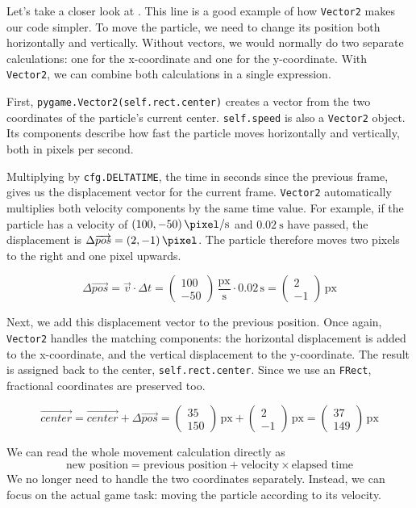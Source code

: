 \begin{hintbox}
	Let's take a closer look at . This line is a good example of how \texttt{Vector2} makes our code simpler. To move the particle, we need to change its position both horizontally and vertically. Without vectors, we would normally do two separate calculations: one for the x-coordinate and one for the y-coordinate. With \texttt{Vector2}, we can combine both calculations in a single expression.
	
	First, \texttt{pygame.Vector2(self.rect.center)} creates a vector from the two coordinates of the particle's current center. \texttt{self.speed} is also a \texttt{Vector2} object. Its components describe how fast the particle moves horizontally and vertically, both in pixels per second.
	
	Multiplying by \texttt{cfg.DELTATIME}, the time in seconds since the previous frame, gives us the displacement vector for the current frame. \texttt{Vector2} automatically multiplies both velocity components by the same time value. For example, if the particle has a velocity of $\mysi{(100, -50)}{\pixel\per\second}$ and $\SI{0.02}{\second}$ have passed, the displacement is $\Delta \overrightarrow{pos} = \mysi{(2, -1)}{\pixel}$. The particle therefore moves two pixels to the right and one pixel upwards.
	
	\[
	\Delta \overrightarrow{pos}
	= \vec{v} \cdot \Delta t
	= \begin{pmatrix} 100 \\ -50 \end{pmatrix} \,\frac{\mathrm{px}}{\mathrm{s}}	\cdot 0.02\,\mathrm{s}
	= \begin{pmatrix} 2 \\ -1 \end{pmatrix}	\,\mathrm{px}
	\]
	
	Next, we add this displacement vector to the previous position. Once again, \texttt{Vector2} handles the matching components: the horizontal displacement is added to the x-coordinate, and the vertical displacement to the y-coordinate. The result is assigned back to the center, \texttt{self.rect.center}. Since we use an \texttt{FRect}, fractional coordinates are preserved too.
	
	\[
	\overrightarrow{center}
	= \overrightarrow{center} + \Delta \overrightarrow{pos}
	= \begin{pmatrix} 35 \\ 150 \end{pmatrix}\,\mathrm{px}  + \begin{pmatrix} 2 \\ -1 \end{pmatrix}
	\,\mathrm{px}
	= \begin{pmatrix} 37 \\ 149 \end{pmatrix} \,\mathrm{px}
	\]
	
	We can read the whole movement calculation directly as
	\[\text{new position} = \text{previous position} + \text{velocity} \times \text{elapsed time}\]
	We no longer need to handle the two coordinates separately. Instead, we can focus on the actual game task: moving the particle according to its velocity.
\end{hintbox}

